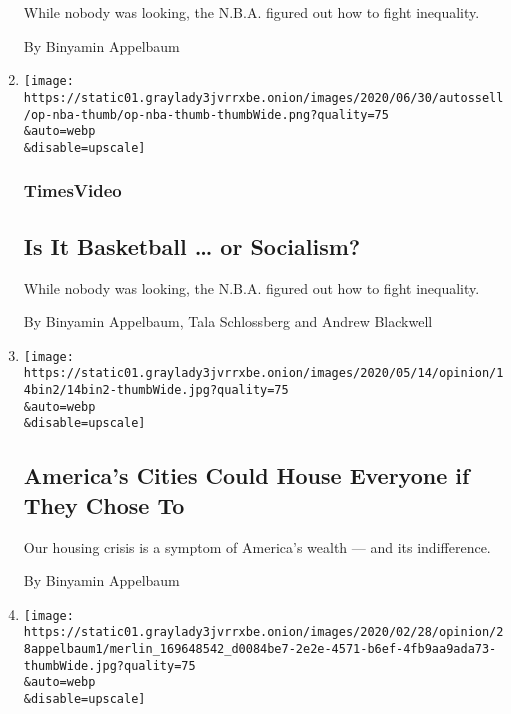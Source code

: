 \begin{enumerate}
  While nobody was looking, the N.B.A. figured out how to fight
  inequality.

  By Binyamin Appelbaum
\item
  \href{/video/opinion/100000007182805/income-inequality-nba-socialism.html}{}

  \texttt{[image: https://static01.graylady3jvrrxbe.onion/images/2020/06/30/autossell/op-nba-thumb/op-nba-thumb-thumbWide.png?quality=75\\\&auto=webp\\\&disable=upscale]}

  \hypertarget{timesvideo}{%
  \subsubsection{TimesVideo}\label{timesvideo}}

  \hypertarget{is-it-basketball--or-socialism-1}{%
  \subsection{Is It Basketball \ldots{} or
  Socialism?}\label{is-it-basketball--or-socialism-1}}

  While nobody was looking, the N.B.A. figured out how to fight
  inequality.

  By Binyamin Appelbaum, Tala Schlossberg and Andrew Blackwell
\item
  \href{/2020/05/15/opinion/sunday/homeless-crisis-affordable-housing-cities.html}{}

  \texttt{[image: https://static01.graylady3jvrrxbe.onion/images/2020/05/14/opinion/14bin2/14bin2-thumbWide.jpg?quality=75\\\&auto=webp\\\&disable=upscale]}

  \hypertarget{americas-cities-could-house-everyone-if-they-chose-to}{%
  \subsection{America's Cities Could House Everyone if They Chose
  To}\label{americas-cities-could-house-everyone-if-they-chose-to}}

  Our housing crisis is a symptom of America's wealth --- and its
  indifference.

  By Binyamin Appelbaum
\item
  \href{/2020/02/28/opinion/coronavirus-economy-fed.html}{}

  \texttt{[image: https://static01.graylady3jvrrxbe.onion/images/2020/02/28/opinion/28appelbaum1/merlin\_169648542\_d0084be7-2e2e-4571-b6ef-4fb9aa9ada73-thumbWide.jpg?quality=75\\\&auto=webp\\\&disable=upscale]}


\end{enumerate}
